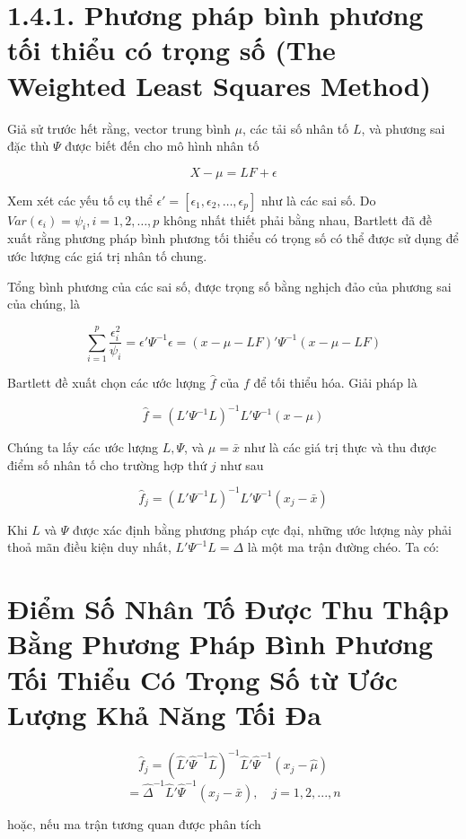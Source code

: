 \documentclass{article}
\begin{document}
\section* {1.4.1. Phương pháp bình phương tối thiểu có trọng số (The Weighted Least Squares Method)}

Giả sử trước hết rằng, vector trung bình \(\mu\), các tải số nhân tố \(L\), và phương sai đặc thù \(\Psi\) được biết đến cho mô hình nhân tố

\[
X - \mu = L F + \epsilon
\]

Xem xét các yếu tố cụ thể \(\epsilon' = [\epsilon_1, \epsilon_2, \dots, \epsilon_p]\) như là các sai số. Do \(Var(\epsilon_i) = \psi_i, i = 1, 2, \dots, p\) không nhất thiết phải bằng nhau, Bartlett đã đề xuất rằng phương pháp bình phương tối thiểu có trọng số có thể được sử dụng để ước lượng các giá trị nhân tố chung.

Tổng bình phương của các sai số, được trọng số bằng nghịch đảo của phương sai của chúng, là

\[
\sum_{i=1}^{p} \frac{\epsilon_i^2}{\psi_i} = \epsilon' \Psi^{-1} \epsilon = (x - \mu - LF)' \Psi^{-1} (x - \mu - LF)
\]

Bartlett đề xuất chọn các ước lượng \(\hat{f}\) của \(f\) để tối thiểu hóa. Giải pháp là

\[
\hat{f} = (L' \Psi^{-1} L)^{-1} L' \Psi^{-1} (x - \mu)
\]

Chúng ta lấy các ước lượng \(L, \Psi\), và \(\mu = \bar{x}\) như là các giá trị thực và thu được điểm số nhân tố cho trường hợp thứ \(j\) như sau

\[
\hat{f}_j = (L' \Psi^{-1} L)^{-1} L' \Psi^{-1} (x_j - \bar{x})
\]

Khi \(L\) và \(\Psi\) được xác định bằng phương pháp cực đại, những ước lượng này phải thoả mãn điều kiện duy nhất, \(L' \Psi^{-1} L = \Delta\) là một ma trận đường chéo.
Ta có:

\section*{Điểm Số Nhân Tố Được Thu Thập Bằng Phương Pháp Bình Phương Tối Thiểu Có Trọng Số từ Ước Lượng Khả Năng Tối Đa}

\[
\hat{f}_j = (\hat{L}' \hat{\Psi}^{-1} \hat{L})^{-1} \hat{L}' \hat{\Psi}^{-1} (x_j - \hat{\mu})
\]
\[
= \hat{\Delta}^{-1} \hat{L}' \hat{\Psi}^{-1} (x_j - \bar{x}), \quad j = 1,2,...,n
\]

hoặc, nếu ma trận tương quan được phân tích
\end{document}
